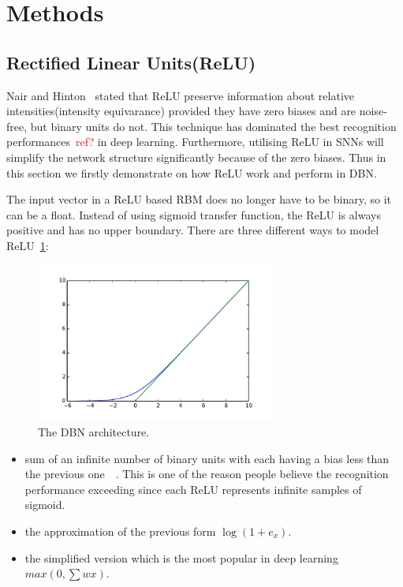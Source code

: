 \section{Methods}
	\subsection{Rectified Linear Units(ReLU)}
	Nair and Hinton~\cite{nair2010rectified} stated that ReLU preserve information about relative intensities(intensity equivarance) provided they have zero biases and are noise-free, but binary units do not.
	This technique has dominated the best recognition performances~\textcolor{red}{ref?} in deep learning.
	Furthermore, utilising ReLU in SNNs will simplify the network structure significantly because of the zero biases.
	Thus in this section we firstly demonstrate on how ReLU work and perform in DBN.
	
	The input vector in a ReLU based RBM does no longer have to be binary, so it can be a float.
	Instead of using sigmoid transfer function, the ReLU is always positive and has no upper boundary.
	There are three different ways to model ReLU~\ref{Fig:relu_tranf}:
	\begin{figure}[hbt]
		\centering
		\includegraphics[width=0.7\textwidth]{pics_sdbn/relu.pdf}
		\caption{The DBN architecture.} 
		\label{Fig:relu_tranf}
	\end{figure}
	\begin{itemize}
		\item sum of an infinite number of binary units with each having a bias less than the previous one~~\cite{nair2010rectified}.
		This is one of the reason people believe the recognition performance exceeding since each ReLU represents infinite samples of sigmoid. 
		\item the approximation of the previous form $\log(1+e_x)$.
		\item the simplified version which is the most popular in deep learning $max(0,\sum w x)$.
	\end{itemize}  

